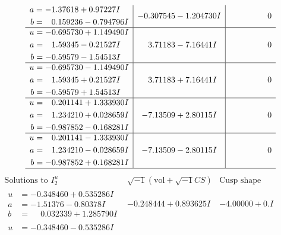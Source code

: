 \documentclass[1p]{elsarticle_modified}
\theoremstyle{definition}
\newcommand{\I}{\sqrt{-1}}
\begin{document}
$$\begin{array}{c|c|c}
\begin{aligned}
a &= -1.37618 + 0.97227 I \\
b &= \phantom{-}0.159236 - 0.794796 I\end{aligned}
 & -0.307545 - 1.204730 I & \phantom{-0.000000 } 0 \\ \hline\begin{aligned}
u &= -0.695730 + 1.149490 I \\
a &= \phantom{-}1.59345 - 0.21527 I \\
b &= -0.59579 - 1.54513 I\end{aligned}
 & \phantom{-}3.71183 - 7.16441 I & \phantom{-0.000000 } 0 \\ \hline\begin{aligned}
u &= -0.695730 - 1.149490 I \\
a &= \phantom{-}1.59345 + 0.21527 I \\
b &= -0.59579 + 1.54513 I\end{aligned}
 & \phantom{-}3.71183 + 7.16441 I & \phantom{-0.000000 } 0 \\ \hline\begin{aligned}
u &= \phantom{-}0.201141 + 1.333930 I \\
a &= \phantom{-}1.234210 + 0.028659 I \\
b &= -0.987852 - 0.168281 I\end{aligned}
 & -7.13509 + 2.80115 I & \phantom{-0.000000 } 0 \\ \hline\begin{aligned}
u &= \phantom{-}0.201141 - 1.333930 I \\
a &= \phantom{-}1.234210 - 0.028659 I \\
b &= -0.987852 + 0.168281 I\end{aligned}
 & -7.13509 - 2.80115 I & \phantom{-0.000000 } 0\\
 \hline 
 \end{array}$$\newpage$$\begin{array}{c|c|c}  
\text{Solutions to }I^u_{2}& \I (\text{vol} + \sqrt{-1}CS) & \text{Cusp shape}\\
 \hline 
\begin{aligned}
u &= -0.348460 + 0.535286 I \\
a &= -1.51376 - 0.80378 I \\
b &= \phantom{-}0.032339 + 1.285790 I\end{aligned}
 & -0.248444 + 0.893625 I & -4.00000 + 0. I\phantom{ +0.000000I} \\ \hline\begin{aligned}
u &= -0.348460 - 0.535286 I \\

\end{aligned}
\end{array}$$
\end{document}

